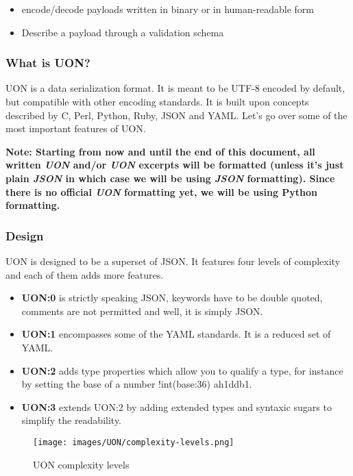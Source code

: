 \documentclass[12pt]{article}
\begin{document}
\begin{itemize}
  \item encode/decode payloads written in binary or in human-readable form
  \item Describe a payload through a validation schema
\end{itemize}

\subsubsection{What is UON?}
UON is a data serialization format. It is meant to be UTF-8 encoded by default, but compatible with other encoding standards. It is built upon concepts described by C, Perl, Python, Ruby, JSON and YAML. Let’s go over some of the most important features of UON.

\textbf{Note: Starting from now and until the end of this document, all written \emph{UON} and/or \emph{UON} excerpts will be formatted (unless it's just plain \emph{JSON} in which case we will be using \emph{JSON} formatting). Since there is no official \emph{UON} formatting yet, we will be using Python formatting.}

\subsubsection{Design}
UON is designed to be a superset of JSON. It features four levels of complexity and each of them adds more features.

\begin{itemize}
    \item \textbf{UON:0} is strictly speaking JSON, keywords have to be double quoted, comments are not permitted and well, it is simply JSON.
    \item \textbf{UON:1} encompasses some of the YAML standards. It is a reduced set of YAML.
    \item \textbf{UON:2} adds type properties which allow you to qualify a type, for instance by setting the base of a number !int(base:36) ah1ddb1.
    \item \textbf{UON:3} extends UON:2 by adding extended types and syntaxic sugars to simplify the readability.
\end{itemize}

\begin{figure}[ht!]
 	\centering
 	\caption{UON complexity levels}
 	\texttt{[image: images/UON/complexity-levels.png]}
 	\label{fig:Complexity levels}
\end{figure}
\end{document}
